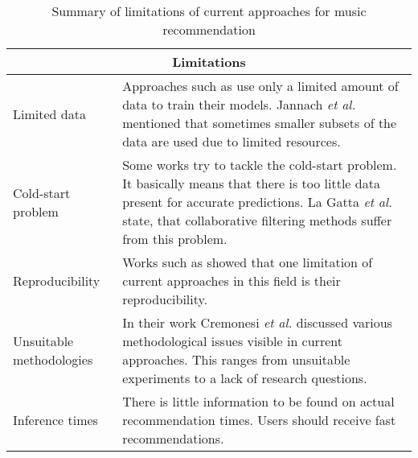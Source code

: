 \documentclass[runningheads,a4paper]{llncs}
\begin{document}
\begin{table}[!ht]
\centering
\begin{tabular}{|p{5cm}||p{5cm}|}
  \hline
  \multicolumn{2}{|c|}{Limitations}\\
  \hline
  Limited data & Approaches such as \cite{niyazov2021content} use only a limited amount of data to train their models. Jannach \textit{et al.} \cite{jannach2020deep} mentioned that sometimes smaller subsets of the data are used due to limited resources.\\
  \hline
  Cold-start problem & Some works try to tackle the cold-start problem. It basically means that there is too little data present for accurate predictions.
  La Gatta \textit{et al.} \cite{la2022music} state, that collaborative filtering methods suffer from this problem. \\
  \hline
  Reproducibility & Works such as \cite{cremonesi2021progress} showed that one limitation of current approaches in this field is their reproducibility.\\
  \hline
  Unsuitable methodologies & In their work \cite{cremonesi2021progress} Cremonesi \textit{et al.} discussed various methodological issues visible in current approaches. This ranges from unsuitable experiments to a lack of research questions.\\
  \hline
  Inference times & There is little information to be found on actual recommendation times. Users should receive fast recommendations.\\
  \hline
\end{tabular}
\caption{Summary of limitations of current approaches for music recommendation}
\end{table}
\end{document}
